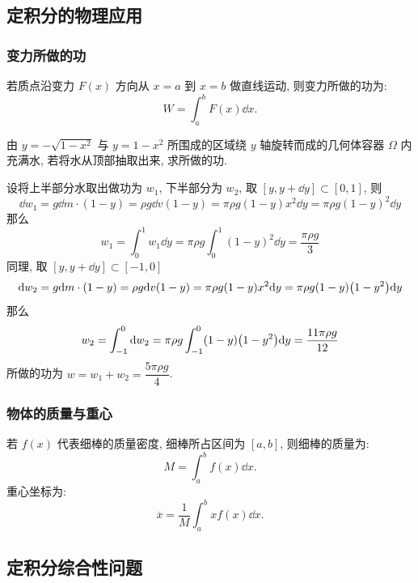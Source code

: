\subsection{定积分的物理应用}

\subsubsection{变力所做的功}

\begin{theorem}[变力的功]
    若质点沿变力 $F(x)$ 方向从 $x=a$ 到 $x=b$ 做直线运动, 则变力所做的功为:
    $$W=\int_{a}^{b}F(x)\dd x.$$
\end{theorem}

\begin{example}
    由 $y=-\sqrt{1-x^2}$ 与 $y=1-x^2$ 所围成的区域绕 $y$ 轴旋转而成的几何体容器 $\Omega$ 内充满水, 若将水从顶部抽取出来, 求所做的功.
\end{example}
\begin{solution}
    设将上半部分水取出做功为 $w_1$, 下半部分为 $w_2$, 取 $[y,y+\dd y]\subset[0,1]$, 则
    $$
        \dd w_1=g\dd m\cdot(1-y)=\rho g\dd v(1-y)=\pi \rho g(1-y)x^2\dd y=\pi \rho g(1-y)^2\dd y
    $$
    那么 $$
        w_1=\int_{0}^{1} w_1 \dd y=\pi\rho g\int_{0}^{1} (1-y)^2 \dd y=\dfrac{\pi \rho g}{3}
    $$
    同理, 取 $[y,y+\dd y]\subset[-1,0]$
    $$
        \dd w_2=g \dd m\cdot (1-y)=\rho g\dd v(1-y)=\pi \rho g(1-y)x^2\dd y=\pi \rho g(1-y)\qty(1-y^2)\dd y
    $$
    那么 $$
        w_2=\int_{-1}^{0} \dd w_2 =\pi \rho g \int_{-1}^{0} (1-y)\qty(1-y^2) \dd y=\dfrac{11\pi \rho  g}{12}
    $$
    所做的功为 $w=w_1+w_2=\dfrac{5\pi\rho g}{4}$.
\end{solution}

\subsubsection{物体的质量与重心}

\begin{theorem}[质量与重心坐标公式]
    若 $f(x)$ 代表细棒的质量密度, 细棒所占区间为 $[a,b]$, 则细棒的质量为:
    $$M=\int_{a}^{b}f(x)\dd x.$$
    重心坐标为:
    $$\overline{x}=\dfrac{1}{M}\int_{a}^{b}xf(x)\dd x.$$
\end{theorem}

\subsection{定积分综合性问题}

